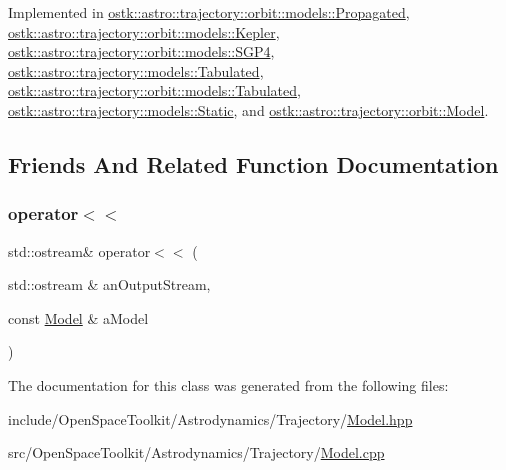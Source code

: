Implemented in \hyperlink{classostk_1_1astro_1_1trajectory_1_1orbit_1_1models_1_1_propagated_a2b8aa6ff5511dbe92e6a3e7f4dd6880b}{ostk\+::astro\+::trajectory\+::orbit\+::models\+::\+Propagated}, \hyperlink{classostk_1_1astro_1_1trajectory_1_1orbit_1_1models_1_1_kepler_a9c71803234f356ade03453e3ae19ae94}{ostk\+::astro\+::trajectory\+::orbit\+::models\+::\+Kepler}, \hyperlink{classostk_1_1astro_1_1trajectory_1_1orbit_1_1models_1_1_s_g_p4_a12416476201382c3d1e3c620f7be106a}{ostk\+::astro\+::trajectory\+::orbit\+::models\+::\+S\+G\+P4}, \hyperlink{classostk_1_1astro_1_1trajectory_1_1models_1_1_tabulated_a330bfffa50eb77eb7f6d45cfec1e9e29}{ostk\+::astro\+::trajectory\+::models\+::\+Tabulated}, \hyperlink{classostk_1_1astro_1_1trajectory_1_1orbit_1_1models_1_1_tabulated_a66be3f1f23a464c666c38a3adcc3bab5}{ostk\+::astro\+::trajectory\+::orbit\+::models\+::\+Tabulated}, \hyperlink{classostk_1_1astro_1_1trajectory_1_1models_1_1_static_aae663f763324f081911ea47070c9f79f}{ostk\+::astro\+::trajectory\+::models\+::\+Static}, and \hyperlink{classostk_1_1astro_1_1trajectory_1_1orbit_1_1_model_a8ea45c1a6e51a6153ce3f72f5294f0c6}{ostk\+::astro\+::trajectory\+::orbit\+::\+Model}.



\subsection{Friends And Related Function Documentation}
\mbox{\label{classostk_1_1astro_1_1trajectory_1_1_model_a68240493d08f91f6613186eb52823e85}} 
\subsubsection{\texorpdfstring{operator$<$$<$}{operator<<}}
{\footnotesize\ttfamily std\+::ostream\& operator$<$$<$ (\begin{DoxyParamCaption}\item[{std\+::ostream \&}]{an\+Output\+Stream,  }\item[{const \hyperlink{classostk_1_1astro_1_1trajectory_1_1_model}{Model} \&}]{a\+Model }\end{DoxyParamCaption})\hspace{0.3cm}{\ttfamily [friend]}}



The documentation for this class was generated from the following files\+:\begin{DoxyCompactItemize}
\item 
include/\+Open\+Space\+Toolkit/\+Astrodynamics/\+Trajectory/\hyperlink{_trajectory_2_model_8hpp}{Model.\+hpp}\item 
src/\+Open\+Space\+Toolkit/\+Astrodynamics/\+Trajectory/\hyperlink{_trajectory_2_model_8cpp}{Model.\+cpp}\end{DoxyCompactItemize}
